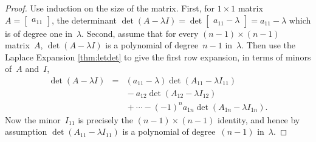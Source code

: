 \begin{proof} 
Use induction on the size of the matrix.
First, for \(1\times 1\) matrix \(A=\begin{bmatrix} a_{11} \end{bmatrix}\), the determinant \(\det(A-\lambda I)=\det \begin{bmatrix} a_{11}-\lambda \end{bmatrix}=a_{11}-\lambda\) which is of  degree one in~\(\lambda\).
Second, assume that for every \((n-1)\times (n-1)\) matrix~\(A\), \(\det(A-\lambda I)\) is a polynomial of degree~\(n-1\) in~\(\lambda\).
Then use the Laplace Expansion \autoref{thm:letdet} to give the first row expansion, in terms of minors of~\(A\) and~\(I\),
\begin{eqnarray*}
\det(A-\lambda I)
&=&(a_{11}-\lambda)\det (A_{11}-\lambda I_{11})
\\&&{}
-a_{12}\det (A_{12}-\lambda I_{12})
\\&&{}
+\cdots-(-1)^{n}a_{1n}\det (A_{1n}-\lambda I_{1n}).
\end{eqnarray*}
Now the minor~\(I_{11}\) is precisely the \((n-1)\times(n-1)\) identity, and hence by assumption \(\det(A_{11}-\lambda I_{11})\) is a polynomial of degree~\((n-1)\) in~\(\lambda\).

\end{proof}
